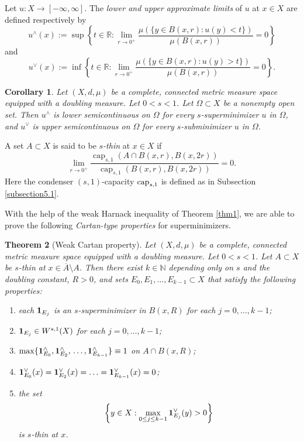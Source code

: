 \documentclass[11pt,leqno]{amsart}
\newtheorem{theorem}{Theorem}[section]
\newtheorem{corollary}[theorem]{Corollary}
\numberwithin{equation}{section}
\theoremstyle{definition}
\DeclareMathOperator{\capp}{cap}
\newcommand{\caps}{\capp_{s,1}}
\begin{document}
	Let $u:X\to [-\infty,\infty]$.
	The \emph{lower and upper approximate limits} of $u$ at $x\in X$
	are defined respectively by 
	\begin{equation}\label{eq3.19-2011}
		u^\wedge(x):= \sup\left\{ t\in\mathbb R: \lim_{r\to 0^+}\frac{\mu(\{y\in B(x,r): u(y)<t\}) }{\mu(B(x,r))}=0 \right\}
	\end{equation}
	and
	\begin{equation}\label{eq3.20-2011}
		u^\vee(x):= \inf\left\{ t\in\mathbb R: \lim_{r\to 0^+}\frac{\mu( \{y\in B(x,r): u(y)>t\}) }{\mu(B(x,r))}=0 \right\}.
	\end{equation}
	
	\begin{corollary}\label{cor3.3-16oct}
		Let $(X,d,\mu)$ be a complete, connected metric measure space equipped with a doubling measure. Let $0<s<1$. Let $\Omega\subset X$ be a nonempty open set. 
		Then $u^\wedge$ is lower semicontinuous on $\Omega$ for every $s$-superminimizer $u$ in $\Omega$, and $u^\vee$ is upper semicontinuous on $\Omega$ for every $s$-subminimizer $u$ in $\Omega$.
	\end{corollary}
	
	A set $A\subset X$
	is said to be \emph{$s$-thin} at $x\in X$ if 
	\[
	\lim_{r\to0^+} \frac{\caps(A\cap B(x,r), B(x,2r))}{\caps(B(x,r),B(x,2r))} =0.
	\] 
	Here the condenser $(s,1)$-capacity ${\rm cap}_{s,1}$ is defined as in Subsection \ref{subsection5.1}.
	
	With the help of the weak Harnack inequality of Theorem \ref{thm1},
	we are able to prove the following \emph{Cartan-type properties} for superminimizers.
	
	\begin{theorem}[Weak Cartan property]\label{weakCartan-main}
		Let $(X,d,\mu)$ be a complete, connected metric measure space equipped with a doubling measure.  
		Let $0<s<1$.
		Let $A\subset X$ be $s$-thin at $x\in \overline A \setminus A$. 
		Then there exist
		$k\in\mathbb N$ depending only on $s$ and the doubling constant, $R>0$, and
		sets $ E_0, E_1, \ldots, E_{k-1}\subset X$ that satisfy the following properties:
		\begin{enumerate}
			\item \label{a-item-} each ${\bf 1}_{E_{j}}$ is an $s$-superminimizer in $B(x,R)$ for each $j=0,\ldots,k-1$; 
			
			\item \label{b-item-} ${\bf 1}_{E_{j}}\in W^{s,1}(X)$ for each $j=0,\ldots,k-1$;
			
			\item \label{c-item-} $\max\{{\bf 1}_{E_0}^\wedge, {\bf 1}_{E_2}^{\wedge},\,\ldots, {\bf 1}_{E_{k-1}}^\wedge\}\equiv 1$ on $A\cap B(x,R)$;
			
			\item \label{d-item-} ${\bf 1}_{E_0}^\vee(x)={\bf 1}_{E_2}^\vee(x)=\ldots={\bf 1}_{E_{k-1}}^\vee(x)=0$;
			
			\item \label{e-item-} the set 
			\[
			\left\{y\in X: \max_{0\leq j\leq k-1} {\bf 1}_{E_j}^\vee(y)>0\right\}
			\]
			is $s$-thin at $x$.
		\end{enumerate}
	\end{theorem}
	
\end{document}
